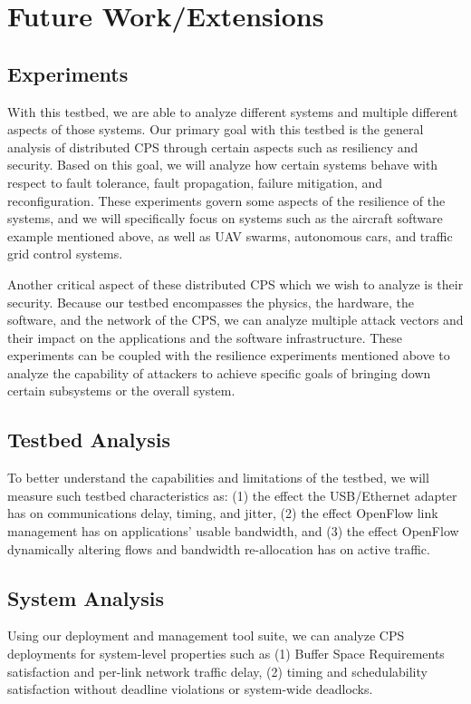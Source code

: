 \section{Future Work/Extensions}
\label{sec:Extensions}
\subsection{Experiments}
With this testbed, we are able to analyze different systems and multiple different aspects of those systems.  Our primary goal with this testbed is the general analysis of distributed CPS through certain aspects such as resiliency and security.  Based on this goal, we will analyze how certain systems behave with respect to fault tolerance, fault propagation, failure mitigation, and reconfiguration.  These experiments govern some aspects of the resilience of the systems, and we will specifically focus on systems such as the aircraft software example mentioned above, as well as UAV swarms, autonomous cars, and traffic grid control systems.  

Another critical aspect of these distributed CPS which we wish to analyze is their security.  Because our testbed encompasses the physics, the hardware, the software, and the network of the CPS, we can analyze multiple attack vectors and their impact on the applications and the software infrastructure.  These experiments can be coupled with the resilience experiments mentioned above to analyze the capability of attackers to achieve specific goals of bringing down certain subsystems or the overall system.  
\subsection{Testbed Analysis}
To better understand the capabilities and limitations of the testbed, we will measure such testbed characteristics as: (1) the effect the USB/Ethernet adapter has on communications delay, timing, and jitter, (2) the effect OpenFlow link management has on applications' usable bandwidth, and (3) the effect OpenFlow dynamically altering flows and bandwidth re-allocation has on active traffic.
\subsection{System Analysis}
Using our deployment and management tool suite, we can analyze CPS deployments for system-level properties such as (1) Buffer Space Requirements satisfaction and per-link network traffic delay, (2) timing and schedulability satisfaction without deadline violations or system-wide deadlocks.
